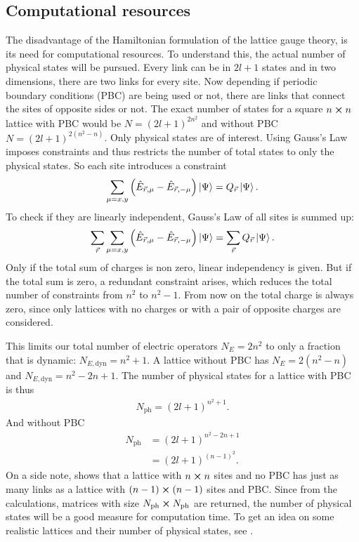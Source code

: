 \subsection{Computational resources}
The disadvantage of the Hamiltonian formulation of the lattice gauge theory, is its need for computational resources.\cite{Feynman1982} To understand this, the actual number of physical states will be pursued. Every link can be in $2l+1$ states and in two dimensions, there are two links for every site. Now depending if periodic boundary conditions (PBC) are being used or not, there are links that connect the sites of opposite sides or not.
The exact number of states for a square $n \cross n$ lattice with PBC would be $N=(2l+1)^{2n^2}$ and without PBC $N=(2l+1)^{2(n^2-n)}$. Only physical states are of interest. Using Gauss's Law imposes constraints and thus restricts the number of total states to only the physical states. So each site introduces a constraint
\begin{align}
  \sum_{\mu=x,y}\left(\hat{E}_{\vec{r}, \mu} - \hat{E}_{\vec{r}, -\mu}\right)\ket{\Psi} = Q_{\vec{r}}\ket{\Psi}.
\end{align}
To check if they are linearly independent, Gauss's Law of all sites is summed up:
\begin{align}
	\sum_{\vec{r}}\sum_{\mu=x,y}\left(\hat{E}_{\vec{r}, \mu} - \hat{E}_{\vec{r}, -\mu}\right)\ket{\Psi} = \sum_{\vec{r}}Q_{\vec{r}}\ket{\Psi}.
\end{align}
Only if the total sum of charges is non zero, linear independency is given. But if the total sum is zero, a redundant constraint arises, which reduces the total number of constraints from $n^2$ to $n^2 -1$. From now on the total charge is always zero, since only lattices with no charges or with a pair of opposite charges are considered.

This limits our total number of electric operators $N_{E}=2n^2$ to only a fraction that is dynamic: $N_{E,\text{dyn}} = n^2+1$. A lattice without PBC has $N_{E}=2(n^2-n)$ and $N_{E,\text{dyn}} = n^2-2n+1$.
The number of physical states for a lattice with PBC is thus
\begin{align}
	N_{\text{ph}}=(2l+1)^{n^2+1}.
\end{align}
And without PBC
\begin{align}
	N_{\text{ph}} & =(2l+1)^{n^2-2n+1}                \\
	              & =(2l+1)^{(n-1)^{2}}.\label{eq:pbc}
\end{align}
On a side note,  shows that a  lattice with $n\cross n$ sites and no PBC has just as many links as a lattice with $(n-1)\cross(n-1)$ sites and PBC.
Since from the calculations, matrices with size $N_{\text{ph}} \cross N_{\text{ph}}$ are returned, the number of physical states will be a good measure for computation time.
To get an idea on some realistic lattices and their number of physical states, see .

